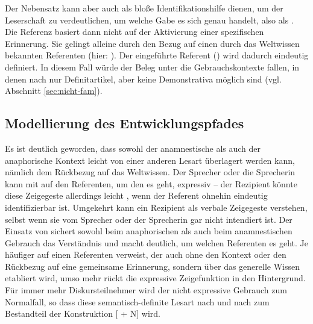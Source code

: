 \noindent 
Der Nebensatz kann aber auch als bloße Identifikationshilfe dienen, um der Leserschaft zu verdeutlichen, um welche Gabe es sich genau handelt, also als  \parencite[79]{Himmelmann1997}. Die Referenz basiert dann nicht auf der Aktivierung einer spezifischen Erinnerung. Sie gelingt alleine durch den Bezug auf einen durch das Weltwissen bekannten Referenten (hier: ). Der eingeführte Referent () wird dadurch eindeutig definiert.  In diesem Fall würde der Beleg unter die  Gebrauchskontexte fallen, in denen nach \textcite{Hawkins1978} nur Definitartikel, aber keine Demonstrativa möglich sind (vgl. Abschnitt \ref{sec:nicht-fam}). 

%
%

\subsection{Modellierung des Entwicklungspfades}\label{sec:disk-entwicklung}

Es ist deutlich geworden, dass sowohl der anamnestische als auch der anaphorische Kontext leicht von einer anderen Lesart überlagert werden kann, nämlich dem Rückbezug auf das Weltwissen. Der Sprecher oder die Sprecherin kann mit   auf den Referenten, um den es geht, expressiv  -- der Rezipient könnte diese Zeigegeste allerdings leicht , wenn der Referent ohnehin eindeutig identifizierbar ist. Umgekehrt kann ein Rezipient  als verbale Zeigegeste verstehen, selbst wenn sie vom Sprecher oder der Sprecherin gar nicht intendiert ist.
Der Einsatz von  sichert sowohl beim anaphorischen als auch beim anamnestischen Gebrauch das Verständnis und macht deutlich, um welchen Referenten es geht. Je häufiger  auf einen Referenten verweist, der auch ohne den Kontext oder den Rückbezug auf eine gemeinsame Erinnerung, sondern über das generelle Wissen etabliert wird, umso mehr rückt die expressive Zeigefunktion in den Hintergrund. Für immer mehr Diskursteilnehmer wird der nicht expressive Gebrauch zum Normalfall, so dass diese semantisch-definite Lesart nach und nach zum Bestandteil der Konstruktion [ + N] wird. 


